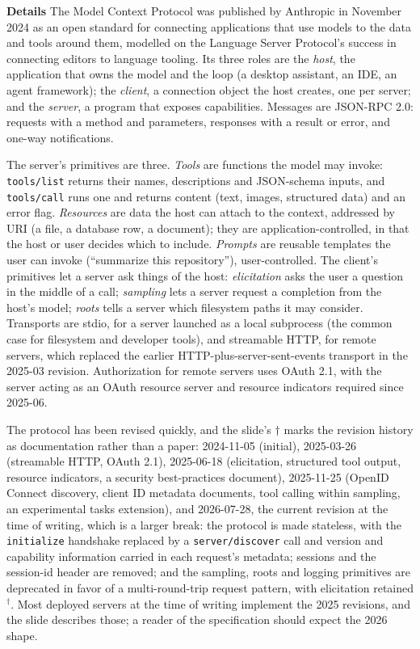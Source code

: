 \documentclass[11pt,letterpaper]{article}
\newcommand{\para}[1]{\medskip\noindent\textbf{#1}\quad}
\begin{document}
\para{Details} The Model Context Protocol was published by Anthropic in November 2024 as an open standard for connecting applications that use models to the data and tools around them, modelled on the Language Server Protocol's success in connecting editors to language tooling. Its three roles are the \emph{host}, the application that owns the model and the loop (a desktop assistant, an IDE, an agent framework); the \emph{client}, a connection object the host creates, one per server; and the \emph{server}, a program that exposes capabilities. Messages are JSON-RPC 2.0: requests with a method and parameters, responses with a result or error, and one-way notifications.

The server's primitives are three. \emph{Tools} are functions the model may invoke: \texttt{tools/list} returns their names, descriptions and JSON-schema inputs, and \texttt{tools/call} runs one and returns content (text, images, structured data) and an error flag. \emph{Resources} are data the host can attach to the context, addressed by URI (a file, a database row, a document); they are application-controlled, in that the host or user decides which to include. \emph{Prompts} are reusable templates the user can invoke (``summarize this repository''), user-controlled. The client's primitives let a server ask things of the host: \emph{elicitation} asks the user a question in the middle of a call; \emph{sampling} lets a server request a completion from the host's model; \emph{roots} tells a server which filesystem paths it may consider. Transports are stdio, for a server launched as a local subprocess (the common case for filesystem and developer tools), and streamable HTTP, for remote servers, which replaced the earlier HTTP-plus-server-sent-events transport in the 2025-03 revision. Authorization for remote servers uses OAuth 2.1, with the server acting as an OAuth resource server and resource indicators required since 2025-06.

The protocol has been revised quickly, and the slide's $\dagger$ marks the revision history as documentation rather than a paper: 2024-11-05 (initial), 2025-03-26 (streamable HTTP, OAuth 2.1), 2025-06-18 (elicitation, structured tool output, resource indicators, a security best-practices document), 2025-11-25 (OpenID Connect discovery, client ID metadata documents, tool calling within sampling, an experimental tasks extension), and 2026-07-28, the current revision at the time of writing, which is a larger break: the protocol is made stateless, with the \texttt{initialize} handshake replaced by a \texttt{server/discover} call and version and capability information carried in each request's metadata; sessions and the session-id header are removed; and the sampling, roots and logging primitives are deprecated in favor of a multi-round-trip request pattern, with elicitation retained$^\dagger$. Most deployed servers at the time of writing implement the 2025 revisions, and the slide describes those; a reader of the specification should expect the 2026 shape.
\end{document}
